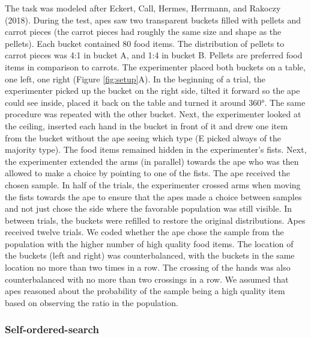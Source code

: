 \documentclass[
  man,floatsintext]{apa6}
\begin{document}
The task was modeled after Eckert, Call, Hermes, Herrmann, and Rakoczy (2018). During the test, apes saw two transparent buckets filled with pellets and carrot pieces (the carrot pieces had roughly the same size and shape as the pellets). Each bucket contained 80 food items. The distribution of pellets to carrot pieces was 4:1 in bucket A, and 1:4 in bucket B. Pellets are preferred food items in comparison to carrots. The experimenter placed both buckets on a table, one left, one right (Figure \ref{fig:setup}A). In the beginning of a trial, the experimenter picked up the bucket on the right side, tilted it forward so the ape could see inside, placed it back on the table and turned it around 360°. The same procedure was repeated with the other bucket. Next, the experimenter looked at the ceiling, inserted each hand in the bucket in front of it and drew one item from the bucket without the ape seeing which type (E picked always of the majority type). The food items remained hidden in the experimenter's fists. Next, the experimenter extended the arms (in parallel) towards the ape who was then allowed to make a choice by pointing to one of the fists. The ape received the chosen sample. In half of the trials, the experimenter crossed arms when moving the fists towards the ape to ensure that the apes made a choice between samples and not just chose the side where the favorable population was still visible. In between trials, the buckets were refilled to restore the original distributions. Apes received twelve trials. We coded whether the ape chose the sample from the population with the higher number of high quality food items. The location of the buckets (left and right) was counterbalanced, with the buckets in the same location no more than two times in a row. The crossing of the hands was also counterbalanced with no more than two crossings in a row. We assumed that apes reasoned about the probability of the sample being a high quality item based on observing the ratio in the population.

\hypertarget{self-ordered-search}{%
\subsubsection{Self-ordered-search}\label{self-ordered-search}}
\end{document}
